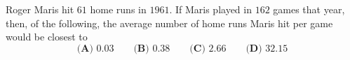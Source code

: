 Roger Maris hit $61$ home runs in $1961$. If Maris played in $162$ games that year, then, of the following, the average number of home runs Maris hit per game would be closest to
\[
\textbf{(A) }0.03\qquad\textbf{(B) }0.38\qquad\textbf{(C) }2.66\qquad\textbf{(D) }32.15
\]
